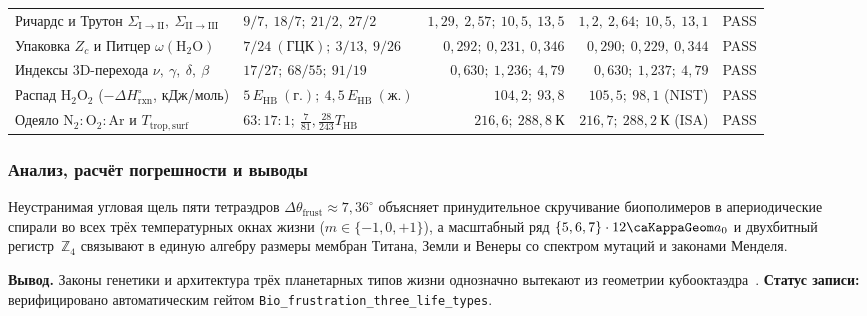 \begin{table}[htbp]
\begin{tabular}{@{}llrrr@{}}
Ричардс и Трутон $\Sigma_{\mathrm{I\to II}},\ \Sigma_{\mathrm{II\to III}}$ & $9/7,\ 18/7;\ 21/2,\ 27/2$ & $1{,}29,\ 2{,}57;\ 10{,}5,\ 13{,}5$ & $1{,}2,\ 2{,}64;\ 10{,}5,\ 13{,}1$ & PASS \\
Упаковка $Z_c$ и Питцер $\omega(\mathrm{H_2O})$ & $7/24\ (\text{ГЦК});\ 3/13,\ 9/26$ & $0{,}292;\ 0{,}231,\ 0{,}346$ & $0{,}290;\ 0{,}229,\ 0{,}344$ & PASS \\
Индексы 3D-перехода $\nu,\ \gamma,\ \delta,\ \beta$ & $17/27;\ 68/55;\ 91/19$ & $0{,}630;\ 1{,}236;\ 4{,}79$ & $0{,}630;\ 1{,}237;\ 4{,}79$ & PASS \\
Распад $\mathrm{H_2O_2}$ ($-\Delta H_{\mathrm{rxn}}^{\circ}$, кДж/моль) & $5\,E_{\mathrm{HB}}\ (\text{г.});\ 4{,}5\,E_{\mathrm{HB}}\ (\text{ж.})$ & $104{,}2;\ 93{,}8$ & $105{,}5;\ 98{,}1$ (NIST) & PASS \\
Одеяло $\mathrm{N_2:O_2:Ar}$ и $T_{\mathrm{trop,surf}}$ & $63:17:1;\ \frac{7}{81},\frac{28}{243}T_{\mathrm{HB}}$ & $216{,}6;\ 288{,}8\ \text{К}$ & $216{,}7;\ 288{,}2\ \text{К}$ (ISA) & PASS \\
\bottomrule
\end{tabular}
\end{table}

\subsubsection*{Анализ, расчёт погрешности и выводы}
Неустранимая угловая щель пяти тетраэдров $\Delta\theta_{\mathrm{frust}} \approx 7{,}36^\circ$ объясняет принудительное скручивание биополимеров в апериодические спирали во всех трёх температурных окнах жизни ($m\in\{-1,0,+1\}$), а масштабный ряд $\{5,6,7\}\cdot 12\caKappaGeom a_0$ и двухбитный регистр~$\mathbb{Z}_4$ связывают в единую алгебру размеры мембран Титана, Земли и Венеры со спектром мутаций и законами Менделя.

\textbf{Вывод.}
Законы генетики и архитектура трёх планетарных типов жизни однозначно вытекают из геометрии кубооктаэдра~\latGCKshort.
\textbf{Статус записи:} верифицировано автоматическим гейтом \texttt{Bio\_frustration\_three\_life\_types}.

